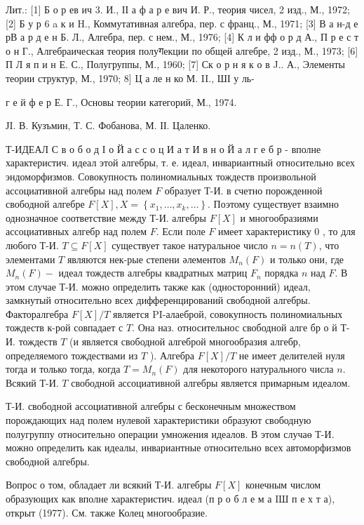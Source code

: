 \documentclass[10pt]{article}
\begin{document}
Лит.: [1] Б о р ев ич 3. И., ІІ а ф а р е вич И. Р., теория чисел, 2 изд., М., 1972; [2] Б у р 6 a к и H., Коммутативная алгебра, пер. с франц., М., 1971; [3] В а н-д е рВ а р д е н Б. Л., Алгебра, пер. с нем., М., 1976; [4] К л и фф о р д А., П р е с т о н Г., Алгебраическая теория полуगекции по общей алгебре, 2 изд., М., 1973; [6] П Л я п и н Е. С., Полугруппы, М., 1960; [7] Ск о р н я к о в J.. А., Элементы теории структур, М., 1970; 8] Ц а ле н ко М. II., ШІ у ль-

г е й ф е р Е. Г., Основы теории категорий, М., 1974.

ЈI. В. Кузъмин, Т. С. Фобанова, М. ІІ. Цаленко.



Т-ИДЕАЛ С в о б о д І о Й а с с о ц И а т И в н о Й а л г е б р - вполне характеристич. идеал этой алгебры, т. е. идеал, инвариантный относительно всех эндоморфизмов. Совокупность полиномиальных тождеств произвольной ассоциативной алгебры над полем $F$ образует Т-И. в счетно порожденной свободной алгебре $F[X], X=\left\{x_{1}, \ldots, x_{k}, \ldots\right\}$. Поэтому существует взаимно однозначное соответствие между Т-И. алгебры $F[X]$ и многообразиями ассоциативных алгебр над полем $F$. Если поле $F$ имеет характеристику 0 , то для любого Т-И. $T \subseteq F[X]$ существует такое натуральное число $n=n(T)$, что элементами $T$ являются нек-рые степени әлементов $M_{n}(F)$ и только они, где $M_{n}(F)-$ идеал тождеств алгебры квадратных матриц $F_{n}$ порядка $n$ над $F$. В этом случае Т-И. можно определить также как (односторонний) идеал, замкнутый относительно всех дифференцирований свободной алгебры. Факторалгебра $F[X] / T$ является $\mathrm{PI}$-алаеброй, совокупность полиномиальных тождеств к-рой совпадает с $T$. Она наз. относительнос свободной алге бр о й Т-И. тождеств $T$ (и является свободной алгеброй многообразия алгебр, определяемого тождествами из $T$ ). Алгебра $F[X] / T$ не имеет делителей нуля тогда и только тогда, когда $T=M_{n}(F)$ для некоторого натурального числа $n$. Всякий Т-И. $T$ свободной ассоциативной алгебры является примарным идеалом.



Т-И. свободной ассоциативной алгебры с бесконечным множеством порождающих над полем нулевой характеристики образуют свободную полугруппу относительно операции умножения идеалов. В этом случаө Т-И. можно определить как идеалы, инвариантные относительно всех автоморфизмов свободной алгебры.



Вопрос о том, обладает ли всякий Т-И. алгебры $F[X]$ конечным числом образующих как вполне характеристич. идеал (п р о б л е м а IШ п е х т а), открыт (1977). См. также Колец многообразие.
\end{document}
